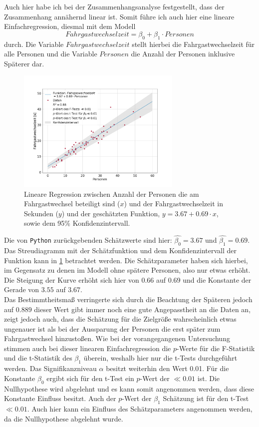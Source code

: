 Auch hier habe ich bei der Zusammenhangsanalyse festgestellt, dass der Zusammenhang annähernd linear ist. Somit führe ich auch hier eine lineare Einfachregression, diesmal mit dem Modell
\begin{equation}
Fahrgastwechselzeit = \beta_0 + \beta_1 \cdot Personen
\end{equation}
durch. Die Variable $Fahrgastwechselzeit$ stellt hierbei die Fahrgastwechselzeit für alle Personen und die Variable $Personen$ die Anzahl der Personen inklusive Späterer dar.
\begin{figure}[H]
	\centering
		\includegraphics[width=0.7\textwidth]{pictures/data_evaluation/transferTime/lin_transfer_time.png}
	\caption{Lineare Regression zwischen Anzahl der Personen die am Fahrgastwechsel beteiligt sind ($x$) und der Fahrgastwechselzeit in Sekunden ($y$) und der geschätzten Funktion, $y= 3.67 + 0.69 \cdot x$, sowie dem 95\% Konfidenzintervall.}
	\label{fig:LinRegAlle}
\end{figure}
Die von \texttt{Python} zurückgebenden Schätzwerte sind hier: $\hat{\beta_0}=3.67$ und $\hat{\beta_1}=0.69$. Das Streudiagramm mit der Schätzfunktion und dem Konfidenzintervall der Funktion kann in \figurename \ref{fig:LinRegAlle} betrachtet werden.
Die Schätzparameter haben sich hierbei, im Gegensatz zu denen im Modell ohne spätere Personen, also nur etwas erhöht. Die Steigung der Kurve erhöht sich hier von $0.66$ auf $0.69$ und die Konstante der Gerade von $3.55$ auf $3.67$. \\
Das Bestimmtheitsmaß verringerte sich durch die Beachtung der Späteren jedoch auf $0.889$ dieser Wert gibt immer noch eine gute Angepasstheit an die Daten an, zeigt jedoch auch, dass die Schätzung für die Zielgröße wahrscheinlich etwas ungenauer ist als bei der Aussparung der Personen die erst später zum Fahrgastwechsel hinzustoßen. Wie bei der vorangegangenen Untersuchung stimmen auch bei dieser linearen Einfachregression die $p$-Werte für die F-Statistik und die t-Statistik des $\beta_1$ überein, weshalb hier nur die t-Tests durchgeführt werden. Das Signifikanzniveau $\alpha$ besitzt weiterhin den Wert 0.01. Für die Konstante $\beta_0$ ergibt sich für den t-Test ein $p$-Wert der $\ll 0.01$ ist. Die Nullhypothese wird abgelehnt und es kann somit angenommen werden, dass diese Konstante Einfluss besitzt. Auch der $p$-Wert der $\beta_1$ Schätzung ist für den t-Test $\ll 0.01$. Auch hier kann ein Einfluss des Schätzparameters angenommen werden, da die Nullhypothese abgelehnt wurde.

